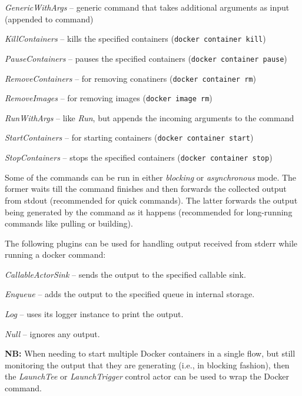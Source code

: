\documentclass[a4paper]{book}
\begin{document}
\begin{tight_itemize}
  \item \textit{GenericWithArgs} -- generic command that takes additional arguments as input (appended to command)
  \item \textit{KillContainers} -- kills the specified containers (\texttt{docker container kill})
  \item \textit{PauseContainers} -- pauses the specified containers (\texttt{docker container pause})
  \item \textit{RemoveContainers} -- for removing conatiners (\texttt{docker container rm})
  \item \textit{RemoveImages} -- for removing images (\texttt{docker image rm})
  \item \textit{RunWithArgs} -- like \textit{Run}, but appends the incoming arguments to the command
  \item \textit{StartContainers} -- for starting containers (\texttt{docker container start})
  \item \textit{StopContainers} -- stops the specified containers (\texttt{docker container stop})
\end{tight_itemize}
Some of the commands can be run in either \textit{blocking} or \textit{asynchronous} mode. The former waits till
the command finishes and then forwards the collected output from stdout (recommended for quick commands). The latter
forwards the output being generated by the command as it happens (recommended for long-running commands like pulling
or building).

\noindent The following plugins can be used for handling output received from stderr while running a docker command:
\begin{tight_itemize}
  \item \textit{CallableActorSink} -- sends the output to the specified callable sink.
  \item \textit{Enqueue} -- adds the output to the specified queue in internal storage.
  \item \textit{Log} -- uses its logger instance to print the output.
  \item \textit{Null} -- ignores any output.
\end{tight_itemize}

\noindent \textbf{NB:} When needing to start multiple Docker containers in a single flow, but still monitoring
the output that they are generating (i.e., in blocking fashion), then the \textit{LaunchTee} or \textit{LaunchTrigger}
control actor can be used to wrap the Docker command.


\end{document}
